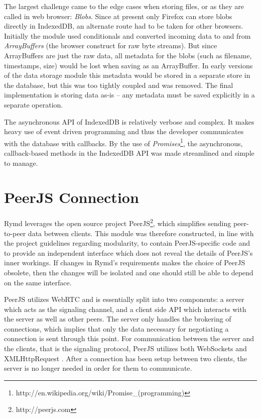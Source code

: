 The largest challenge came to the edge cases when storing files, or as they are called in web browser: \emph{Blobs}. Since at present only Firefox can store blobs directly in IndexedDB, an alternate route had to be taken for other browsers. Initially the module used conditionals and converted incoming data to and from \emph{ArrayBuffers} (the browser construct for raw byte streams). But since ArrayBuffers are just the raw data, all metadata for the blobs (such as filename, timestamps, size) would be lost when saving as an ArrayBuffer. In early versions of the data storage module this metadata would be stored in a separate store in the database, but this was too tightly coupled and was removed. The final implementation is storing data as-is – any metadata must be saved explicitly in a separate operation.

The asynchronous API of IndexedDB is relatively verbose and complex. It makes heavy use of event driven programming and thus the developer communicates with the database with callbacks. By the use of \emph{Promises}\footnote{http://en.wikipedia.org/wiki/Promise\_(programming)}, the asynchronous, callback-based methods in the IndexedDB API was made streamlined and simple to manage.

\section{PeerJS Connection}
\label{sec:p2p}

Rymd leverages the open source project PeerJS\footnote{http://peerjs.com}, which simplifies sending peer-to-peer data between clients. This module was therefore constructed, in line with the project guidelines regarding modularity, to contain PeerJS-specific code and to provide an independent interface which does not reveal the details of PeerJS's inner workings. If changes in Rymd's requirements makes the choice of PeerJS obsolete, then the changes will be isolated and one should still be able to depend on the same interface.

PeerJS utilizes WebRTC and is essentially split into two components: a server which acts as the signaling channel, and a client side API which interacts with the server as well as other peers. The server only handles the brokering of connections, which implies that only the data necessary for negotiating a connection is sent through this point. For communication between the server and the clients, that is the signaling protocol, PeerJS utilizes both WebSockets and XMLHttpRequest \cite{PeerjsGithub:2014:Online}. After a connection has been setup between two clients, the server is no longer needed in order for them to communicate.

